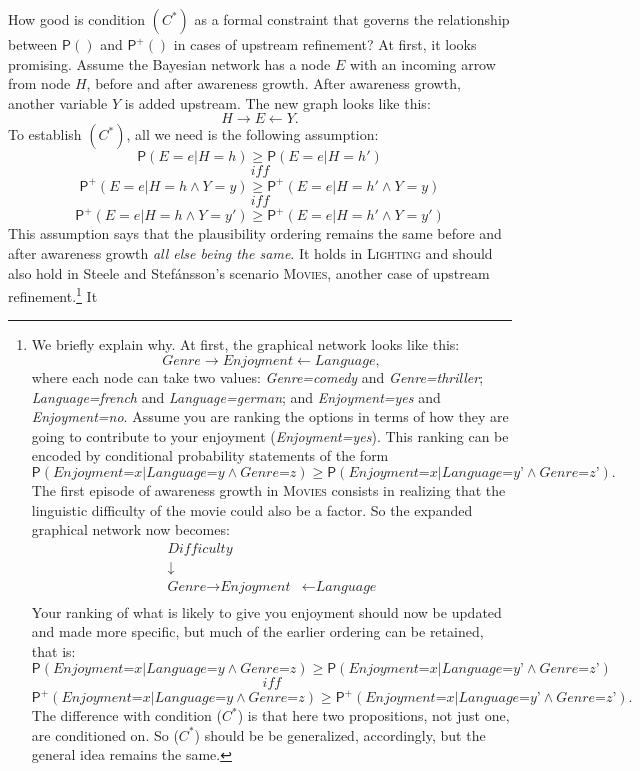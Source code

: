 \documentclass[
  11pt,
  dvipsnames,enabledeprecatedfontcommands]{scrartcl}
\newcommand{\pr}[1]{\ensuremath{\mathsf{P}(#1)}}
\newcommand{\ppr}[2]{\ensuremath{\mathsf{P}^{#1}(#2)}}
\begin{document}
How good is condition \((C^*)\) as a formal constraint that governs the
relationship between \(\pr{}\) and \(\ppr{+}{}\) in cases of upstream
refinement? At first, it looks promising. Assume the Bayesian network
has a node \(E\) with an incoming arrow from node \(H\), before and
after awareness growth. After awareness growth, another variable \(Y\)
is added upstream. The new graph looks like this:
\[H\rightarrow E \leftarrow Y.\] To establish \((C^*)\), all we need is
the following assumption:
\[\pr{E=e \vert H=h} \geq \pr{E=e \vert H=h'} \] \[\textit{ iff }\]
\[\ppr{+}{E=e \vert H=h \wedge Y=y} \geq \ppr{+}{E=e \vert H=h' \wedge Y=y} \tag{EQUAL}\]
\[\textit{ iff }\]
\[\ppr{+}{E=e \vert H=h \wedge Y=y'} \geq \ppr{+}{E=e \vert H=h' \wedge Y=y'}\]
This assumption says that the plausibility ordering remains the same
before and after awareness growth \textit{all else being the same}. It
holds in \textsc{Lighting} and should also hold in Steele and
Stefánsson's scenario \textsc{Movies}, another case of upstream
refinement.\footnote{We briefly explain why. At first, the graphical
  network looks like this:
  \[\textit{Genre} \rightarrow \textit{Enjoyment} \leftarrow \textit{Language},\]
  where each node can take two values: \textit{Genre=comedy} and
  \textit{Genre=thriller}; \textit{Language=french} and
  \textit{Language=german}; and \textit{Enjoyment=yes} and
  \textit{Enjoyment=no}. Assume you are ranking the options in terms of
  how they are going to contribute to your enjoyment
  (\textit{Enjoyment=yes}). This ranking can be encoded by conditional
  probability statements of the form
  \[\pr{\textit{Enjoyment=x} \vert \textit{Language=y} \wedge \textit{Genre=z}} \geq \pr{\textit{Enjoyment=x} \vert \textit{Language=y'} \wedge \textit{Genre=z'}}.\]
  The first episode of awareness growth in \textsc{Movies} consists in
  realizing that the linguistic difficulty of the movie could also be a
  factor. So the expanded graphical network now becomes: \begin{align*}
  \textit{Difficulty} &\\
  \downarrow \\
  \textit{Genre} \rightarrow \textit{Enjoyment} &\leftarrow \textit{Language}\\
  \end{align*} \noindent Your ranking of what is likely to give you
  enjoyment should now be updated and made more specific, but much of
  the earlier ordering can be retained, that is:
  \[\pr{\textit{Enjoyment=x} \vert \textit{Language=y} \wedge \textit{Genre=z}} \geq \pr{\textit{Enjoyment=x} \vert \textit{Language=y'} \wedge \textit{Genre=z'}}\]
  \[\textit{ iff }\]
  \[\ppr{+}{\textit{Enjoyment=x} \vert \textit{Language=y} \wedge \textit{Genre=z}} \geq \ppr{+}{\textit{Enjoyment=x} \vert \textit{Language=y'} \wedge \textit{Genre=z'}}.\]
  The difference with condition (\(C^*\)) is that here two propositions,
  not just one, are conditioned on. So (\(C^*\)) should be be
  generalized, accordingly, but the general idea remains the same.} It
\end{document}
